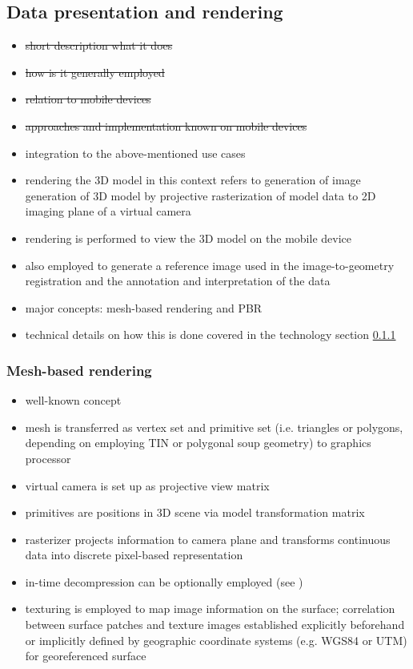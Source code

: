 \documentclass[review]{elsarticle}
\begin{document}
\subsection{Data presentation and rendering}

\begin{itemize}
\item \sout{short description what it does}
\item \sout{how is it generally employed}
\item \sout{relation to mobile devices}
\item \sout{approaches and implementation known on mobile devices}
\item integration to the above-mentioned use cases
\end{itemize}

\begin{itemize}
\item rendering the 3D model in this context refers to generation of image generation of 3D model by projective rasterization of model data to 2D imaging plane of a virtual camera
\item rendering is performed to view the 3D model on the mobile device
\item also employed to generate a reference image used in the image-to-geometry registration and the annotation and interpretation of the data
\item major concepts: mesh-based rendering and \gls{PBR}
\item technical details on how this is done covered in the technology section \ref{}
\end{itemize}

\subsubsection{Mesh-based rendering}

\begin{itemize}
\item well-known concept
\item mesh is transferred as vertex set and primitive set (i.e. triangles or polygons, depending on employing \gls{TIN} or polygonal soup geometry) to graphics processor
\item virtual camera is set up as projective view matrix
\item primitives are positions in 3D scene via model transformation matrix
\item rasterizer projects information to camera plane and transforms continuous data into discrete pixel-based representation
\item in-time decompression can be optionally employed (see \cite{Ponchio2016})
\item texturing is employed to map image information on the surface; correlation between surface patches and texture images established explicitly beforehand or implicitly defined by geographic coordinate systems (e.g. WGS84 or UTM) for georeferenced surface
\end{itemize}
\end{document}
